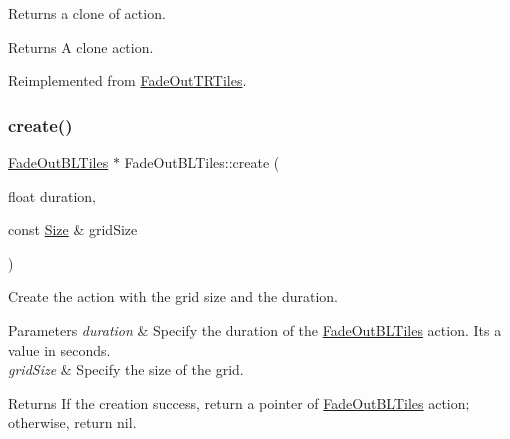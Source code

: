 Returns a clone of action.

\begin{DoxyReturn}{Returns}
A clone action. 
\end{DoxyReturn}


Reimplemented from \hyperlink{classFadeOutTRTiles_af7a6bf6cfa4ef6cccae911b026e49b48}{Fade\+Out\+T\+R\+Tiles}.

\mbox{\label{classFadeOutBLTiles_a825e625fa5bd1dc894d1870ef503e011}} 
\subsubsection{\texorpdfstring{create()}{create()}\hspace{0.1cm}{\footnotesize\ttfamily [1/2]}}
{\footnotesize\ttfamily \hyperlink{classFadeOutBLTiles}{Fade\+Out\+B\+L\+Tiles} $\ast$ Fade\+Out\+B\+L\+Tiles\+::create (\begin{DoxyParamCaption}\item[{float}]{duration,  }\item[{const \hyperlink{classSize}{Size} \&}]{grid\+Size }\end{DoxyParamCaption})\hspace{0.3cm}{\ttfamily [static]}}



Create the action with the grid size and the duration. 


\begin{DoxyParams}{Parameters}
{\em duration} & Specify the duration of the \hyperlink{classFadeOutBLTiles}{Fade\+Out\+B\+L\+Tiles} action. It\textquotesingle{}s a value in seconds. \\
\hline
{\em grid\+Size} & Specify the size of the grid. \\
\hline
\end{DoxyParams}
\begin{DoxyReturn}{Returns}
If the creation success, return a pointer of \hyperlink{classFadeOutBLTiles}{Fade\+Out\+B\+L\+Tiles} action; otherwise, return nil. 
\end{DoxyReturn}
\mbox{\label{classFadeOutBLTiles_a648befb760bc2561a041a51b1b436264}} 
